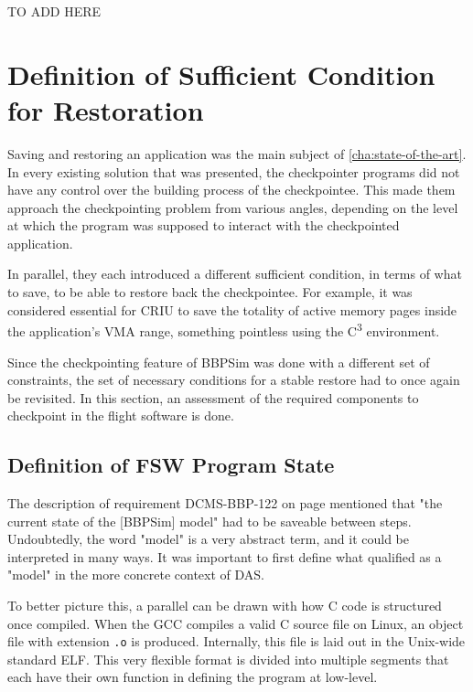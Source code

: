 {TO ADD HERE 

\section{Definition of Sufficient Condition for Restoration}
Saving and restoring an application was the main subject of \autoref{cha:state-of-the-art}. In every existing solution that was presented, the checkpointer programs did not have any control over the building process of the checkpointee. This made them approach the checkpointing problem from various angles, depending on the level at which the program was supposed to interact with the checkpointed application. 

In parallel, they each introduced a different sufficient condition, in terms of what to save, to be able to restore back the checkpointee. For example, it was considered essential for CRIU to save the totality of active memory pages inside the application's \gls{VMA} range, something pointless using the C\textsuperscript{3} environment.

Since the checkpointing feature of BBPSim was done with a different set of constraints, the set of necessary conditions for a stable restore had to once again be revisited. In this section, an assessment of the required components to checkpoint in the flight software is done. 

\subsection*{Definition of FSW Program State}
The description of requirement DCMS-BBP-122 on page \pageref{tab:customer-reqs} mentioned that "the current state of the [BBPSim] model" had to be saveable between steps. Undoubtedly, the word "model" is a very abstract term, and it could be interpreted in many ways. It was important to first define what qualified as a "model" in the more concrete context of DAS.

To better picture this, a parallel can be drawn with how C code is structured once compiled. When the \gls{GCC} compiles a valid C source file on Linux, an object file with extension \texttt{.o} is produced. Internally, this file is laid out in the Unix-wide standard \gls{ELF}. This very flexible format is divided into multiple segments that each have their own function in defining the program at low-level.

}

